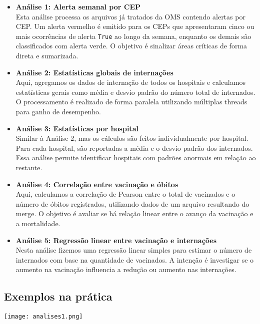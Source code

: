 \documentclass[a4paper,12pt]{article}
\begin{document}
\begin{itemize}
    \item \textbf{Análise 1: Alerta semanal por CEP} \\
    Esta análise processa os arquivos já tratados da OMS contendo alertas por CEP. Um alerta vermelho é emitido para os CEPs que apresentaram cinco ou mais ocorrências de alerta \texttt{True} ao longo da semana, enquanto os demais são classificados com alerta verde. O objetivo é sinalizar áreas críticas de forma direta e sumarizada.

    \item \textbf{Análise 2: Estatísticas globais de internações} \\
    Aqui, agregamos os dados de internação de todos os hospitais e calculamos estatísticas gerais como média e desvio padrão do número total de internados. O processamento é realizado de forma paralela utilizando múltiplas threads para ganho de desempenho.

    \item \textbf{Análise 3: Estatísticas por hospital} \\
    Similar à Análise 2, mas os cálculos são feitos individualmente por hospital. Para cada hospital, são reportadas a média e o desvio padrão dos internados. Essa análise permite identificar hospitais com padrões anormais em relação ao restante.

    \item \textbf{Análise 4: Correlação entre vacinação e óbitos} \\
    Aqui, calculamos a correlação de Pearson entre o total de vacinados e o número de óbitos registrados, utilizando dados de um arquivo resultando do merge. O objetivo é avaliar se há relação linear entre o avanço da vacinação e a mortalidade.
    
    \item \textbf{Análise 5: Regressão linear entre vacinação e internações} \\
    Nesta análise fizemos uma regressão linear simples para estimar o número de internados com base na quantidade de vacinados. A intenção é investigar se o aumento na vacinação influencia a redução ou aumento nas internações.
\end{itemize}

\subsection*{Exemplos na prática}


\texttt{[image: analises1.png]}
\end{document}

